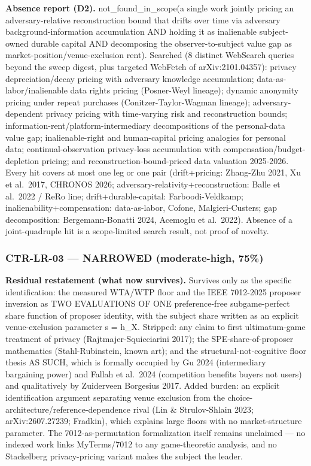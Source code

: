 \documentclass[
  11pt,
]{article}
\begin{document}
\textbf{Absence report (D2).} not\_found\_in\_scope(a single work
jointly pricing an adversary-relative reconstruction bound that drifts
over time via adversary background-information accumulation AND holding
it as inalienable subject-owned durable capital AND decomposing the
observer-to-subject value gap as market-position/venue-exclusion rent).
Searched (8 distinct WebSearch queries beyond the sweep digest, plus
targeted WebFetch of arXiv:2101.04357): privacy depreciation/decay
pricing with adversary knowledge accumulation; data-as-labor/inalienable
data rights pricing (Posner-Weyl lineage); dynamic anonymity pricing
under repeat purchases (Conitzer-Taylor-Wagman lineage);
adversary-dependent privacy pricing with time-varying risk and
reconstruction bounds; information-rent/platform-intermediary
decompositions of the personal-data value gap; inalienable-right and
human-capital pricing analogies for personal data; continual-observation
privacy-loss accumulation with compensation/budget-depletion pricing;
and reconstruction-bound-priced data valuation 2025-2026. Every hit
covers at most one leg or one pair (drift+pricing: Zhang-Zhu 2021, Xu et
al.~2017, CHRONOS 2026; adversary-relativity+reconstruction: Balle et
al.~2022 / ReRo line; drift+durable-capital: Farboodi-Veldkamp;
inalienability+compensation: data-as-labor, Cofone, Malgieri-Custers;
gap decomposition: Bergemann-Bonatti 2024, Acemoglu et al.~2022).
Absence of a joint-quadruple hit is a scope-limited search result, not
proof of novelty.

\subsubsection{CTR-LR-03 --- NARROWED (moderate-high,
75\%)}\label{ctr-lr-03-narrowed-moderate-high-75}

\textbf{Residual restatement (what now survives).} Survives only as the
specific identification: the measured WTA/WTP floor and the IEEE
7012-2025 proposer inversion as TWO EVALUATIONS OF ONE preference-free
subgame-perfect share function of proposer identity, with the subject
share written as an explicit venue-exclusion parameter s = h\_X.
Stripped: any claim to first ultimatum-game treatment of privacy
(Rajtmajer-Squicciarini 2017); the SPE-share-of-proposer mathematics
(Stahl-Rubinstein, known art); and the structural-not-cognitive floor
thesis AS SUCH, which is formally occupied by Gu 2024 (intermediary
bargaining power) and Fallah et al.~2024 (competition benefits buyers
not users) and qualitatively by Zuiderveen Borgesius 2017. Added burden:
an explicit identification argument separating venue exclusion from the
choice-architecture/reference-dependence rival (Lin \& Strulov-Shlain
2023; arXiv:2607.27239; Fradkin), which explains large floors with no
market-structure parameter. The 7012-as-permutation formalization itself
remains unclaimed --- no indexed work links MyTerms/7012 to any
game-theoretic analysis, and no Stackelberg privacy-pricing variant
makes the subject the leader.
\end{document}
